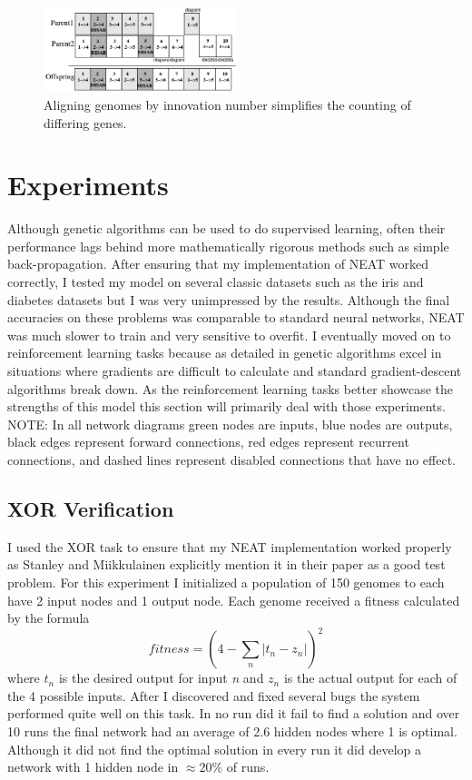 \documentclass[letterpaper]{article}
\begin{document}
\begin{figure}[b]
	\centering
	\includegraphics[width=0.5\textwidth]{images/speciation.png}
	\caption{Aligning genomes by innovation number simplifies the counting of differing genes.}
	\label{fig:speciation}
\end{figure}
  
\section{Experiments} \label{sec:experiments}
Although genetic algorithms can be used to do supervised learning, often their performance lags behind
more mathematically rigorous methods such as simple back-propagation. After ensuring that my implementation of NEAT worked correctly, I tested my model on several classic datasets such as the iris and diabetes datasets but I was very unimpressed by the
results. Although the final accuracies on these problems was comparable to standard neural networks, NEAT was 
much slower to train and very sensitive to overfit. I eventually moved on to reinforcement learning tasks
because as detailed in \cite{whitley} genetic algorithms excel in situations where gradients are difficult to
calculate and standard gradient-descent algorithms break down. As the reinforcement learning tasks better
showcase the strengths of this model this section will primarily deal with those experiments. NOTE: In all
network diagrams green nodes are inputs, blue nodes are outputs, black edges represent forward connections,
red edges represent recurrent connections, and dashed lines represent disabled connections that have no
effect.

\subsection{XOR Verification} \label{sec:xor}
I used the XOR task to ensure that my NEAT implementation worked properly as Stanley and 
Miikkulainen explicitly mention it in their paper as a good test problem. For this experiment I 
initialized a population of 150 genomes to each have 2 input nodes and 1 output node. Each genome received
a fitness calculated by the formula 
\begin{equation}
fitness = (4-\sum_{n} \left|t_n-z_n\right|)^2 
\end{equation}
where $t_n$ is the desired output for input \textit{n} and $z_n$ is the actual output for each of the 4
possible inputs. After I discovered and fixed several bugs the system performed quite well on this task. 
In no run did it fail to find a solution and over 10 runs the final network had an average of 2.6 hidden
nodes where 1 is optimal. Although it did not find the optimal solution in every run it did develop a 
network with 1 hidden node in $\approx20\%$ of runs.
\end{document}
